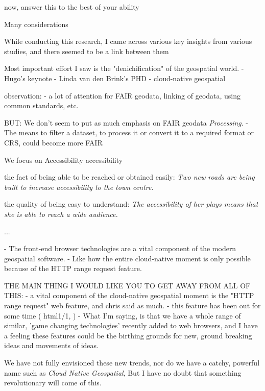 now, answer this to the best of your ability

Many considerations


While conducting this research, I came across various key insights from various studies, and there seemed to be a link between them 

Most important effort I saw is the "denichification" of the geospatial world.
- Hugo's keynote
- Linda van den Brink's PHD
- cloud-native geospatial 

observation: 
- a lot of attention for FAIR geodata, linking of geodata, using common standards, etc. 

BUT: We don't seem to put as much emphasis on FAIR geodata \emph{Processing}. 
- The means to filter a dataset, to process it or convert it to a required format or CRS, could become more FAIR

We focus on Accessibility
accessibility

\m{->} the fact of being able to be reached or obtained easily:
\textit{Two new roads are being built to increase accessibility to the town centre.}

\m{->} the quality of being easy to understand: 
\textit{The accessibility of her plays means that she is able to reach a wide audience.}

...

- The front-end browser technologies are a vital component of the modern geospatial software.
- Like how the entire cloud-native moment is only possible because of the HTTP range request feature. 


THE MAIN THING I WOULD LIKE YOU TO GET AWAY FROM ALL OF THIS:
- a vital component of the cloud-native geospatial moment is the "HTTP range request" web feature, and chris said as much.
  - this feature has been out for some time ( html1/1, )
- What I'm saying, is that we have a whole range of similar, 'game changing technologies' recently added to web browsers, and I have a feeling these features could be the birthing grounds for new, ground breaking ideas and movements of ideas. 

We have not fully envisioned these new trends, nor do we have a catchy, powerful name such as \emph{Cloud Native Geospatial}, But I have no doubt that something revolutionary will come of this. 

